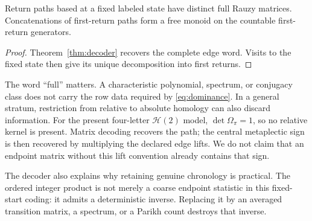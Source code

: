 \begin{corollary}
\label{cor:freeness}
Return paths based at a fixed labeled state have distinct full Rauzy
matrices.  Concatenations of first-return paths form a free monoid on the
countable first-return generators.
\end{corollary}

\begin{proof}
Theorem~\ref{thm:decoder} recovers the complete edge word.  Visits to the
fixed state then give its unique decomposition into first returns.
\end{proof}

The word ``full'' matters.  A characteristic polynomial, spectrum, or
conjugacy class does not carry the row data required by
\eqref{eq:dominance}.  In a general stratum, restriction from relative to
absolute homology can also discard information.  For the present
four-letter \(\mathcal H(2)\) model, \(\det\Omega_\pi=1\), so no relative
kernel is present.  Matrix decoding recovers the path; the central
metaplectic sign is then recovered by multiplying the declared edge lifts.
We do not claim that an endpoint matrix without this lift convention already
contains that sign.

The decoder also explains why retaining genuine chronology is practical.
The ordered integer product is not merely a coarse endpoint statistic in
this fixed-start coding: it admits a deterministic inverse.  Replacing it by
an averaged transition matrix, a spectrum, or a Parikh count destroys that
inverse.
